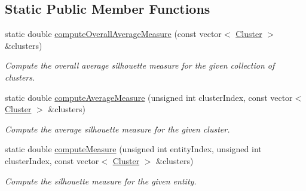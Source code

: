 \subsection*{Static Public Member Functions}
\begin{DoxyCompactItemize}
\item 
static double \hyperlink{classmultiscale_1_1analysis_1_1Silhouette_a21fab3292947caed2dbab0da542ac24c}{compute\-Overall\-Average\-Measure} (const vector$<$ \hyperlink{classmultiscale_1_1analysis_1_1Cluster}{Cluster} $>$ \&clusters)
\begin{DoxyCompactList}\small\item\em Compute the overall average silhouette measure for the given collection of clusters. \end{DoxyCompactList}\item 
static double \hyperlink{classmultiscale_1_1analysis_1_1Silhouette_ac2d55f89072bf46c86b8004d6787a820}{compute\-Average\-Measure} (unsigned int cluster\-Index, const vector$<$ \hyperlink{classmultiscale_1_1analysis_1_1Cluster}{Cluster} $>$ \&clusters)
\begin{DoxyCompactList}\small\item\em Compute the average silhouette measure for the given cluster. \end{DoxyCompactList}\item 
static double \hyperlink{classmultiscale_1_1analysis_1_1Silhouette_a2b418915655903583944d9d2ee9d6db8}{compute\-Measure} (unsigned int entity\-Index, unsigned int cluster\-Index, const vector$<$ \hyperlink{classmultiscale_1_1analysis_1_1Cluster}{Cluster} $>$ \&clusters)
\begin{DoxyCompactList}\small\item\em Compute the silhouette measure for the given entity. \end{DoxyCompactList}\end{DoxyCompactItemize}
